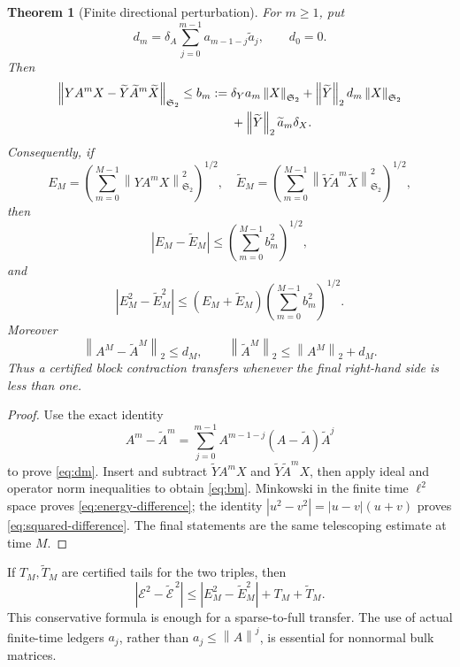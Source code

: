 \documentclass[11pt]{article}
\newtheorem{theorem}{Theorem}[section]
\theoremstyle{remark}
\newcommand{\cE}{\mathcal E}
\newcommand{\HS}{\mathfrak S_2}
\newcommand{\norm}[1]{\left\lVert #1\right\rVert}
\begin{document}
\begin{theorem}[Finite directional perturbation]
\label{thm:perturbation}
For \(m\ge1\), put
\begin{equation}
 d_m=\delta_A\sum_{j=0}^{m-1}a_{m-1-j}\widetilde a_j,
 \qquad d_0=0.
 \label{eq:dm}
\end{equation}
Then
\begin{align}
 \norm{YA^mX-\widetilde Y\widetilde A^m\widetilde X}_{\HS}
 \le b_m:={}&
 \delta_Ya_m\norm X_{\HS}
 +\norm{\widetilde Y}_2d_m\norm X_{\HS}
 \notag\\
 &+\norm{\widetilde Y}_2\widetilde a_m\delta_X.
 \label{eq:bm}
\end{align}
Consequently, if
\[
 E_M=\left(\sum_{m=0}^{M-1}\norm{YA^mX}_{\HS}^2\right)^{1/2},
 \quad
 \widetilde E_M=\left(\sum_{m=0}^{M-1}
 \norm{\widetilde Y\widetilde A^m\widetilde X}_{\HS}^2\right)^{1/2},
\]
then
\begin{equation}
 |E_M-\widetilde E_M|
 \le\left(\sum_{m=0}^{M-1}b_m^2\right)^{1/2},
 \label{eq:energy-difference}
\end{equation}
and
\begin{equation}
 |E_M^2-\widetilde E_M^2|
 \le(E_M+\widetilde E_M)
 \left(\sum_{m=0}^{M-1}b_m^2\right)^{1/2}.
 \label{eq:squared-difference}
\end{equation}
Moreover
\begin{equation}
 \norm{A^M-\widetilde A^M}_2\le d_M,
 \qquad
 \norm{\widetilde A^M}_2\le\norm{A^M}_2+d_M.
 \label{eq:block-transfer}
\end{equation}
Thus a certified block contraction transfers whenever the final right-hand
side is less than one.
\end{theorem}

\begin{proof}
Use the exact identity
\[
 A^m-\widetilde A^m
 =\sum_{j=0}^{m-1}A^{m-1-j}(A-\widetilde A)\widetilde A^j
\]
to prove \eqref{eq:dm}.  Insert and subtract
\(\widetilde YA^mX\) and
\(\widetilde Y\widetilde A^mX\), then apply ideal and operator norm
inequalities to obtain \eqref{eq:bm}.  Minkowski in the finite time
\(\ell^2\) space proves \eqref{eq:energy-difference}; the identity
\(|u^2-v^2|=|u-v|(u+v)\) proves \eqref{eq:squared-difference}.
The final statements are the same telescoping estimate at time \(M\).
\end{proof}

If \(T_M,\widetilde T_M\) are certified tails for the two triples, then
\begin{equation}
 |\cE^2-\widetilde{\cE}^{\,2}|
 \le |E_M^2-\widetilde E_M^2|+T_M+\widetilde T_M.
 \label{eq:full-transfer}
\end{equation}
This conservative formula is enough for a sparse-to-full transfer.  The use
of actual finite-time ledgers \(a_j\), rather than
\(a_j\le\norm A^j\), is essential for nonnormal bulk matrices.
\end{document}
